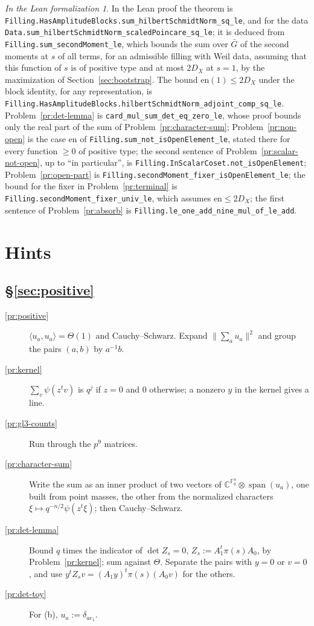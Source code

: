 \documentclass[reqno]{amsart}
\theoremstyle{definition}
\theoremstyle{plain}
\theoremstyle{remark}
\newtheorem*{leanremark}{In the Lean formalization}
\newcommand{\C}{\mathbb{C}}
\newcommand{\F}{\mathbb{F}}
\newcommand{\Gb}{\bar G}
\newcommand{\en}{\mathrm{en}}
\newcommand{\tl}[1]{\texttt{#1}}
\begin{document}
\begin{leanremark}
\raggedright In the Lean proof \cite{GL} the theorem is \tl{Filling.HasAmplitudeBlocks.sum\_hilbertSchmidtNorm\_sq\_le}, and for the data \tl{Data.sum\_hilbertSchmidtNorm\_scaledPoincare\_sq\_le}; it is deduced from \tl{Filling.sum\_secondMoment\_le}, which bounds the sum over \(\Gb\) of the second moments at \(s\) of all terms, for an admissible filling with Weil data, assuming that this function of \(s\) is of positive type and at most \(2D_X\) at \(s=1\), by the maximization of Section~\ref{sec:bootstrap}.  The bound \(\en(1)\le2D_X\) under the block identity, for any representation, is \tl{Filling.HasAmplitudeBlocks.hilbertSchmidtNorm\_adjoint\_comp\_sq\_le}.  Problem~\ref{pr:det-lemma} is \tl{card\_mul\_sum\_det\_eq\_zero\_le}, whose proof bounds only the real part of the sum of Problem~\ref{pr:character-sum}; Problem~\ref{pr:non-open} is the case \(\en\) of \tl{Filling.sum\_not\_isOpenElement\_le}, stated there for every function \(\ge0\) of positive type; the second sentence of Problem~\ref{pr:scalar-not-open}, up to ``in particular'', is \tl{Filling.InScalarCoset.not\_isOpenElement}; Problem~\ref{pr:open-part} is \tl{Filling.secondMoment\_fixer\_isOpenElement\_le}; the bound for the fixer in Problem~\ref{pr:terminal} is \tl{Filling.secondMoment\_fixer\_univ\_le}, which assumes \(\en\le2D_X\); the first sentence of Problem~\ref{pr:absorb} is \tl{Filling.le\_one\_add\_nine\_mul\_of\_le\_add}.
\end{leanremark}

\section*{Hints}

\subsection*{\S\ref{sec:positive}}
\begin{description}
\item[\ref{pr:positive}] \(\langle u_a,u_a\rangle=\Theta(1)\) and Cauchy--Schwarz.  Expand \(\lVert\sum_au_a\rVert^2\) and group the pairs \((a,b)\) by \(a^{-1}b\).
\item[\ref{pr:kernel}] \(\sum_{v}\psi(z^tv)\) is \(q^j\) if \(z=0\) and \(0\) otherwise; a nonzero \(y\) in the kernel gives a line.
\item[\ref{pr:gl3-counts}] Run through the \(p^9\) matrices.
\item[\ref{pr:character-sum}] Write the sum as an inner product of two vectors of \(\C^{\F_q^n}\otimes\operatorname{span}(u_a)\), one built from point masses, the other from the normalized characters \(\xi\mapsto q^{-n/2}\psi(z^t\xi)\); then Cauchy--Schwarz.
\item[\ref{pr:det-lemma}] Bound \(q\) times the indicator of \(\det Z_s=0\), \(Z_s:=A_1^t\pi(s)A_0\), by Problem~\ref{pr:kernel}; sum against \(\Theta\).  Separate the pairs with \(y=0\) or \(v=0\), and use \(y^tZ_sv=(A_1y)^t\pi(s)(A_0v)\) for the others.
\item[\ref{pr:det-toy}] For (b), \(u_a:=\delta_{ae_1}\).
\end{description}
\end{document}
